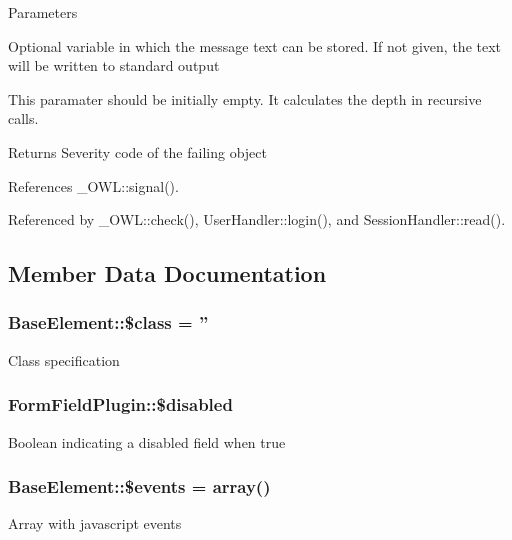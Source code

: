 \begin{DoxyParams}{Parameters}
\item[\mbox{\tt[out]} {\em \$text}]Optional variable in which the message text can be stored. If not given, the text will be written to standard output \item[\mbox{\tt[in]} {\em \$depth}]This paramater should be initially empty. It calculates the depth in recursive calls. \end{DoxyParams}
\begin{DoxyReturn}{Returns}
Severity code of the failing object 
\end{DoxyReturn}


References \_\-OWL::signal().



Referenced by \_\-OWL::check(), UserHandler::login(), and SessionHandler::read().



\subsection{Member Data Documentation}
\subsubsection[{\$class}]{\setlength{\rightskip}{0pt plus 5cm}BaseElement::\$class = ''}\label{classBaseElement_a99976a8e967db92e7800309f359b0803}
Class specification 
\subsubsection[{\$disabled}]{\setlength{\rightskip}{0pt plus 5cm}FormFieldPlugin::\$disabled}\label{classFormFieldPlugin_a2e589ab9610052dfbba6170d6117be37}
Boolean indicating a disabled field when true 
\subsubsection[{\$events}]{\setlength{\rightskip}{0pt plus 5cm}BaseElement::\$events = array()}\label{classBaseElement_a02cebe45d277b4ff8f29db08bad371ba}
Array with javascript events 

